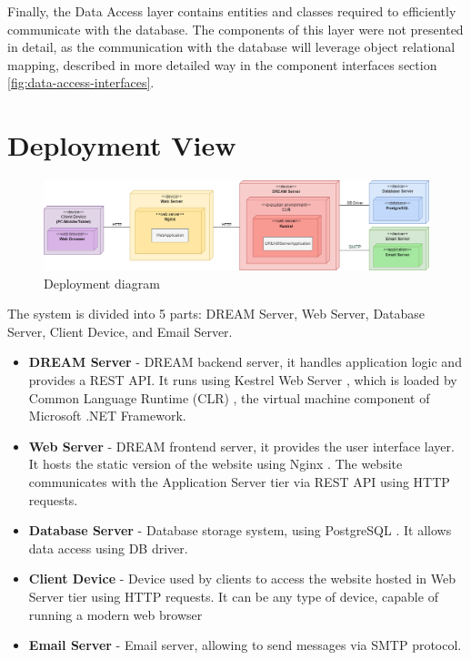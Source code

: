 Finally, the Data Access layer contains entities and classes required to efficiently communicate with the database. The components of this layer were not presented in detail, as the communication with the database will leverage object relational mapping, described in more detailed way in the component interfaces section \ref{fig:data-access-interfaces}.

\section{Deployment View}
\begin{figure}[H]
    \centering
    \includegraphics[width=\textwidth]{diagrams/deployment.png}
    \caption{Deployment diagram}
    \label{fig:deployment}
\end{figure}
The system is divided into 5 parts: DREAM Server, Web Server, Database Server, Client Device, and Email Server.
\begin{itemize}
    \item \textbf{DREAM Server} - DREAM backend server, it handles application logic and provides a REST API. It runs using Kestrel Web Server \cite{kestrel}, which is loaded by Common Language Runtime (CLR) \cite{clr}, the virtual machine component of Microsoft .NET Framework.
    \item \textbf{Web Server} - DREAM frontend server, it provides the user interface layer. It hosts the static version of the website using Nginx \cite{nginx}. The website communicates with the Application Server tier via REST API using HTTP requests.
    \item \textbf{Database Server} - Database storage system, using PostgreSQL \cite{postgresql}. It allows data access using DB driver. 
    \item \textbf{Client Device} - Device used by clients to access the website hosted in Web Server tier using HTTP requests. It can be any type of device, capable of running a modern web browser
    \item \textbf{Email Server} - Email server, allowing to send messages via SMTP protocol.
\end{itemize}

